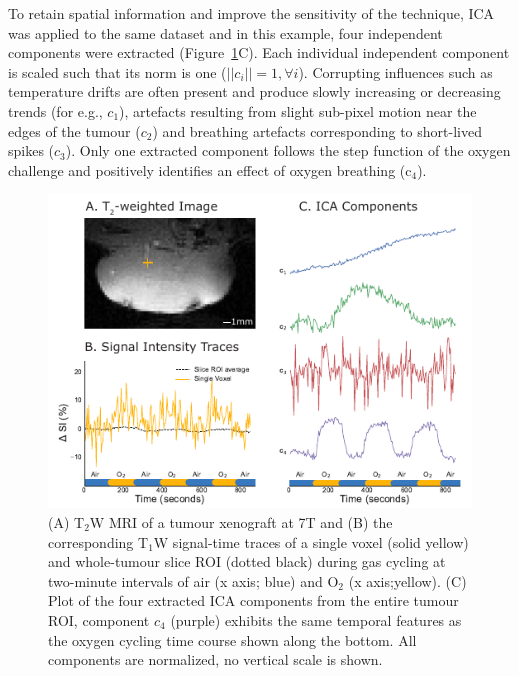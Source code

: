To retain spatial information and improve the sensitivity of the technique, \ac{ICA} was applied to the same dataset and in this example, four independent components were extracted (Figure~\ref{technique}C). 
Each individual independent component is scaled such that its norm is one ($||c_i||=1, \forall i $).
Corrupting influences such as temperature drifts are often present and produce slowly increasing or decreasing trends (for e.g., $c_1$), artefacts resulting from slight sub-pixel motion near the edges of the tumour ($c_2$) and breathing artefacts corresponding to short-lived spikes ($c_3$).
Only one extracted component follows the step function of the oxygen challenge and positively identifies an effect of oxygen breathing (c$_4$).
\begin{figure}[htbp]
   \includegraphics[width=\textwidth]{oemri_thesis1/oemri_thesis1-images/fig1_technique.pdf} %
   \caption{(A) T$_2$W MRI of a tumour xenograft at 7T and (B) the corresponding T$_1$W signal-time traces of a single voxel (solid yellow) and whole-tumour slice ROI (dotted black) during gas cycling at two-minute intervals of air (x axis; blue) and O$_2$ (x axis;yellow).
(C) Plot of the four extracted \ac{ICA} components from the entire tumour ROI, component \textbf{$c_4$} (purple) exhibits the same temporal features as the oxygen cycling time course shown along the bottom. All components are normalized, no vertical scale is shown.}
   \label{technique}
\end{figure}


